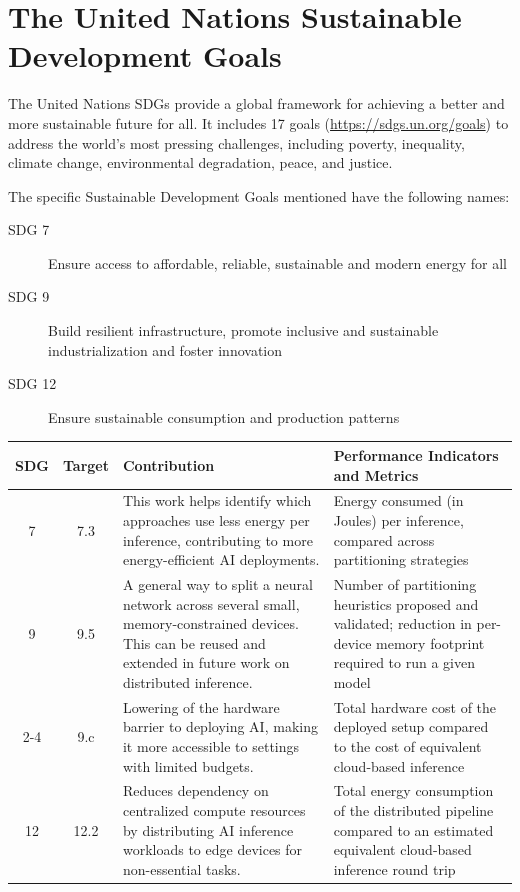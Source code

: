 
\chapter*{The United Nations Sustainable Development Goals} \label{chap:UnitedNations}

The United Nations \acp{SDG} provide a global framework for achieving a better and more 
sustainable future for all. It includes 17 goals (\url{https://sdgs.un.org/goals}) to 
address the world's most pressing challenges, including poverty, inequality, climate 
change, environmental degradation, peace, and justice. 

The specific Sustainable Development Goals mentioned have the following names:

\begin{description}
\item [SDG 7]
Ensure access to affordable, reliable, sustainable and modern energy for all
\item [SDG 9]
Build resilient infrastructure, promote inclusive and sustainable industrialization 
and foster innovation
\item [SDG 12]
Ensure sustainable consumption and production patterns
\end{description}


\begin{center}
\renewcommand{\arraystretch}{1.3}
\begin{tabular}{c c p{5.5cm} p{6cm}}
\toprule
\textbf{SDG} & \textbf{Target} & \textbf{Contribution} & \textbf{Performance Indicators and Metrics} \\
\midrule
7 & 7.3 &
This work helps identify which approaches use less energy per inference, contributing 
to more energy-efficient AI deployments.
&
Energy consumed (in Joules) per inference, compared across partitioning strategies \\
\midrule
9 & 9.5 &
A general way to split a neural network across several small, 
memory-constrained devices. This can be reused and extended in future work on 
distributed inference.
&
Number of partitioning heuristics proposed and validated; reduction in per-device 
memory footprint required to run a given model \\
\cline{2-4}
 & 9.c &
Lowering of the hardware barrier to 
deploying AI, making it more accessible to settings with limited budgets.
&
Total hardware cost of the deployed setup compared to the cost of equivalent 
cloud-based inference \\
\midrule
12 & 12.2 &
Reduces dependency on centralized compute resources by distributing AI inference 
workloads to edge devices for non-essential tasks.
&
Total energy consumption of the distributed pipeline compared to an estimated 
equivalent cloud-based inference round trip \\
\bottomrule
\end{tabular}
\end{center}
